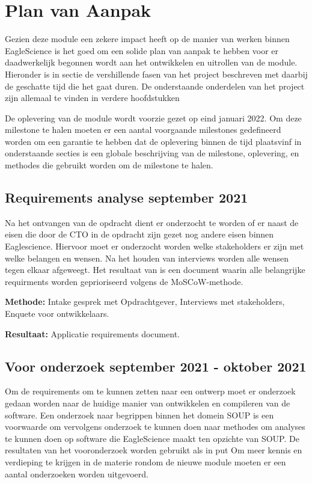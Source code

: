 
\chapter{Plan van Aanpak}\label{ch:planvanaanpak} %


Gezien deze module een zekere impact heeft op de manier van werken binnen EagleScience is het goed om een solide plan van aanpak te hebben voor er daadwerkelijk begonnen wordt aan het ontwikkelen en uitrollen van de module. Hieronder is in sectie de vershillende fasen van het project beschreven met daarbij de geschatte tijd die het gaat duren. De onderstaande onderdelen van het project zijn allemaal te vinden in verdere hoofdstukken

De oplevering van de module wordt voorzie gezet op eind januari 2022. Om deze milestone te halen moeten er een aantal voorgaande milestones gedefineerd worden om een garantie te hebben dat de oplevering binnen de tijd plaatsvinf in onderstaande secties is een globale beschrijving van de milestone, oplevering, en methodes die gebruikt worden om de milestone te halen.

\section{Requirements analyse \textbf{september 2021}}\label{sec:requirements-analyse}
Na het ontvangen van de opdracht dient er onderzocht te worden of er naast de eisen die door de CTO in de opdracht zijn gezet nog andere eisen binnen Eaglescience. Hiervoor moet er onderzocht worden welke stakeholders er zijn met welke belangen en wensen. Na het houden van interviews worden alle wensen tegen elkaar afgeweegt. Het resultaat van is een document waarin alle belangrijke requirments worden geprioriseerd volgens de MoSCoW-methode.

\textbf{Methode:} Intake gesprek met Opdrachtgever, Interviews met stakeholders, Enquete voor ontwikkelaars.

\textbf{Resultaat:} Applicatie requirements document. %

\section{Voor onderzoek \textbf{september 2021 - oktober 2021 }}\label{sec:onderzoek}
Om de requirements om te kunnen zetten naar een ontwerp moet er onderzoek gedaan worden naar de huidige manier van ontwikkelen en compileren van de software. Een onderzoek naar begrippen binnen het domein SOUP is een voorwaarde om vervolgens onderzoek te kunnen doen naar methodes om analyses te kunnen doen op software die EagleScience maakt ten opzichte van SOUP. De resultaten van het vooronderzoek worden gebruikt als in put
Om meer kennis en verdieping te krijgen in de materie rondom de nieuwe module moeten er een aantal onderzoeken worden uitgevoerd.


